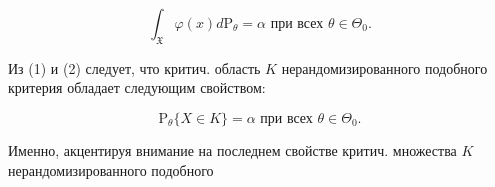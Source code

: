 \documentclass[10pt]{article}
\begin{document}
\[

\int_{\mathfrak{X}} \varphi(x) d \mathrm{P}_{\theta}=\alpha \text { при всех } \theta \in \Theta_{0} .

\]



Из (1) и (2) следует, что критич. область $K$ нерандомизированного подобного критерия обладает следующим свойством:



\[

\mathrm{P}_{\theta}\{X \in K\}=\alpha \text { при всех } \theta \in \Theta_{0} .

\]



Именно, акцентируя внимание на последнем свойстве критич. множества $K$ нерандомизированного подобного
\end{document}

